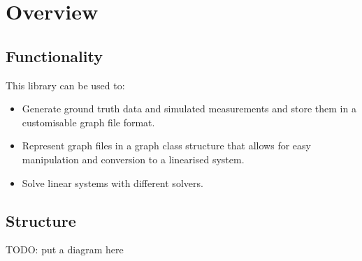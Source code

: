 \section{Overview}

\subsection{Functionality}
This library can be used to:
\begin{itemize}
\item Generate ground truth data and simulated measurements and store them in a customisable graph file format.
\item Represent graph files in a graph class structure that allows for easy manipulation  and conversion to a linearised system.
\item Solve linear systems with different solvers.
\end{itemize}


\subsection{Structure}
TODO: put a diagram here


